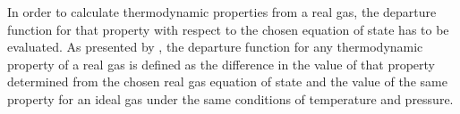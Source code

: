 \documentclass[../Article_Model_Parameters.tex]{subfiles}
\begin{document}
    In order to calculate thermodynamic properties from a real gas, the departure function for that property with respect to the chosen equation of state has to be evaluated. As presented by \citet{Elliott2011}, the departure function for any thermodynamic property of a real gas is defined as the difference in the value of that property determined from the chosen real gas equation of state and the value of the same property for an ideal gas under the same conditions of temperature and pressure. %

			
			
\end{document}
